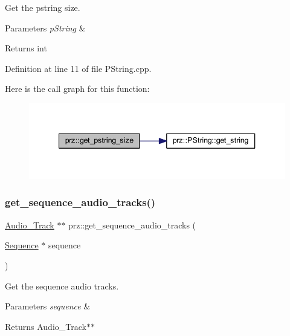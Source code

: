 Get the pstring size. 


\begin{DoxyParams}{Parameters}
{\em p\+String} & \\
\hline
\end{DoxyParams}
\begin{DoxyReturn}{Returns}
int 
\end{DoxyReturn}


Definition at line 11 of file P\+String.\+cpp.

Here is the call graph for this function\+:
\nopagebreak
\begin{figure}[H]
\begin{center}
\leavevmode
\includegraphics[width=340pt]{namespaceprz_abcd7a4fe2b50f3789b630197ee8cc378_cgraph}
\end{center}
\end{figure}
\mbox{\label{namespaceprz_ac5117548474c20a5c1e5ac0998a7c89f}} 
\subsubsection{\texorpdfstring{get\_sequence\_audio\_tracks()}{get\_sequence\_audio\_tracks()}}
{\footnotesize\ttfamily \mbox{\hyperlink{classprz_1_1_audio___track}{Audio\+\_\+\+Track}} $\ast$$\ast$ prz\+::get\+\_\+sequence\+\_\+audio\+\_\+tracks (\begin{DoxyParamCaption}\item[{\mbox{\hyperlink{classprz_1_1_sequence}{Sequence}} $\ast$}]{sequence }\end{DoxyParamCaption})}



Get the sequence audio tracks. 


\begin{DoxyParams}{Parameters}
{\em sequence} & \\
\hline
\end{DoxyParams}
\begin{DoxyReturn}{Returns}
Audio\+\_\+\+Track$\ast$$\ast$ 
\end{DoxyReturn}


